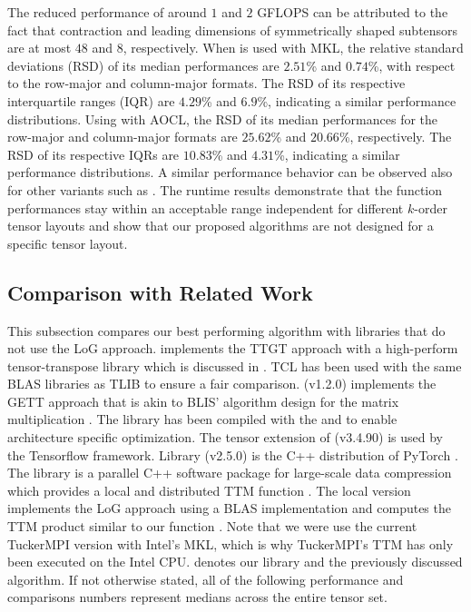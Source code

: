The reduced performance of around $1$ and $2$ GFLOPS can be attributed to the fact that contraction and leading dimensions of symmetrically shaped subtensors are at most $48$ and $8$, respectively.
When  is used with MKL, the relative standard deviations (RSD) of its median performances are $2.51$\% and $0.74$\%, with respect to the row-major and column-major formats.
The RSD of its respective interquartile ranges (IQR) are $4.29$\% and $6.9$\%, indicating a similar performance distributions.
Using  with AOCL, the RSD of its median performances for the row-major and column-major formats are $25.62$\% and $20.66$\%, respectively.
The RSD of its respective IQRs are $10.83$\% and $4.31$\%, indicating a similar performance distributions.
A similar performance behavior can be observed also for other  variants such as .
The runtime results demonstrate that the function performances stay within an acceptable range independent for different $k$-order tensor layouts and show that our proposed algorithms are not designed for a specific tensor layout.






\subsection{Comparison with Related Work}
This subsection compares our best performing algorithm with libraries that do not use the LoG approach.
 implements the TTGT approach with a high-perform tensor-transpose library  which is discussed in \cite{springer:2018:design}.
TCL has been used with the same BLAS libraries as TLIB to ensure a fair comparison.
 (v1.2.0) implements the GETT approach that is akin to BLIS' algorithm design for the matrix multiplication \cite{matthews:2018:high}.
The library has been compiled with the  and  to enable architecture specific optimization.
The tensor extension of  (v3.4.90) is used by the Tensorflow framework.
Library  (v2.5.0) is the C++ distribution of PyTorch \cite{paszke:2019:pytorch}.
The  library is a parallel C++ software package for large-scale data compression which provides a local and distributed TTM function \cite{ballard:2020:tuckermpi}.
The local version implements the LoG approach using a BLAS implementation and computes the TTM product similar to our function .
Note that we were use the current TuckerMPI version with Intel's MKL, which is why TuckerMPI's TTM has only been executed on the Intel CPU.
 denotes our library and the previously discussed  algorithm.
If not otherwise stated, all of the following performance and comparisons numbers represent medians across the entire tensor set.

